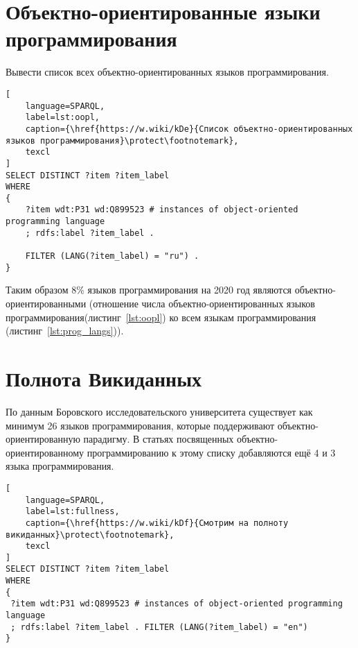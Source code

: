\section{Объектно-ориентированные языки программирования}
Вывести список всех объектно-ориентированных языков программирования.

\begin{lstlisting}[
	language=SPARQL,
	label=lst:oopl,
	caption={\href{https://w.wiki/kDe}{Список объектно-ориентированных языков программирования}\protect\footnotemark},
	texcl
]
SELECT DISTINCT ?item ?item_label
WHERE
{
    ?item wdt:P31 wd:Q899523 # instances of object-oriented programming language
    ; rdfs:label ?item_label . 

    FILTER (LANG(?item_label) = "ru") . 
}
\end{lstlisting}


Таким образом 8\% языков программирования на 2020 год являются объектно-ориентированными (отношение числа объектно-ориентированных языков программирования(листинг~\ref{lst:oopl}) ко всем языкам программирования (листинг~\ref{lst:prog_langs})).

\section{Полнота Викиданных}
По данным Боровского исследовательского университета\cite{link_1} существует как минимум 26 языков программирования, которые поддерживают объектно-ориентированную парадигму. В статьях посвященных объектно-ориентированному программированию к этому списку добавляются ещё 4\cite{link_2} и 3\cite{link_3} языка программирования.

\begin{lstlisting}[
	language=SPARQL,
	label=lst:fullness,
	caption={\href{https://w.wiki/kDf}{Смотрим на полноту викиданных}\protect\footnotemark},
	texcl
]
SELECT DISTINCT ?item ?item_label
WHERE
{
 ?item wdt:P31 wd:Q899523 # instances of object-oriented programming language
 ; rdfs:label ?item_label . FILTER (LANG(?item_label) = "en")
}
\end{lstlisting}

